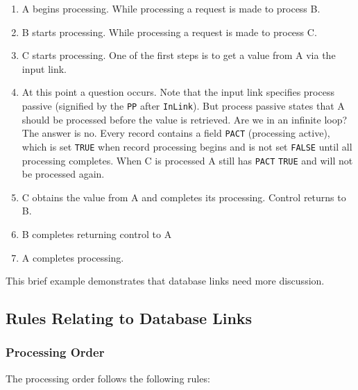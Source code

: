 \begin{enumerate}
\item A begins processing.
While processing a request is made to process B.

\item B starts processing.
While processing a request is made to process C.

\item C starts processing.
One of the first steps is to get a value from A via the input link.

\item At this point a question occurs.
Note that the input link specifies process passive (signified by the \verb|PP| after \verb|InLink|).
But process passive states that A should be processed before the value is retrieved.
Are we in an infinite loop?
The answer is no.
Every record contains a field \verb|PACT| (processing active), which is set \verb|TRUE| when record processing begins and is not set \verb|FALSE| until all processing completes.
When C is processed A still has \verb|PACT| \verb|TRUE| and will not be processed again.

\item C obtains the value from A and completes its processing.
Control returns to B.

\item B completes returning control to A

\item A completes processing.

\end{enumerate}

This brief example demonstrates that database links need more discussion.

\subsection{Rules Relating to Database Links}

\subsubsection{Processing Order}

The processing order follows the following rules:

